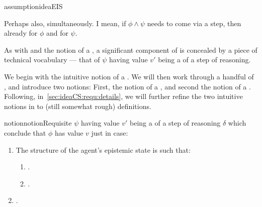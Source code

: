\begin{note}
\begin{restatable}{assumption}{ideaEIS}
\begin{enumerate}
\begin{enumerate}[label=\alph*., ref=(\alph*)]
        Perhaps also, simultaneously.
        I mean, if \(\phi \land \psi\) needs to come via a step, then already for \(\phi\) and for \(\psi\).
      \end{enumerate}
    \end{enumerate}
    \vspace{-\baselineskip}
  \end{restatable}
\end{note}

\begin{note}
  As with \ideaS{} and the notion of a \emph{\sink{}}, a significant component of \ideaCS{} is concealed by a piece of technical vocabulary --- that of \(\psi\) having value \(v'\) being a \emph{\requ{}} of a step of reasoning.

  We begin with the intuitive notion of a \requ{}.
  We will then work through a handful of , and introduce two notions:
  First, the notion of a \crequ{}, and second the notion of a \prequ{}.
  Following, in~\autoref{sec:ideaCS:requ:details}, we will further refine the two intuitive notions in to (still somewhat rough) definitions.

  \begin{restatable}{notion}{notionRequisite}
    \label{notion:requ}
    \(\psi\) having value \(v'\) being a \requ{} of a step of reasoning \(\delta\) which conclude that \(\phi\) has value \(v\) just in case:
    \begin{enumerate}[label=\arabic*., ref=\named{\dag \Re:\arabic*}]
    \item
      \label{notion:requ:structure}
      The structure of the agent's epistemic state is such that:
      \begin{enumerate}[label=\alph*., ref=\named{\dag \Re:1\alph*}]
      \item
        \label{notion:requ:structure:psi}
        \requNotionEpVAd{}.
      \item
        \label{notion:requ:structure:need-psi}
        \requNotionSubset{}.
      \end{enumerate}
    \item
      \label{notion:requ:possible-psi}
      \requNotionReasoningUC{}.
    \end{enumerate}
    \vspace{-\baselineskip}
  \end{restatable}
\end{note}

